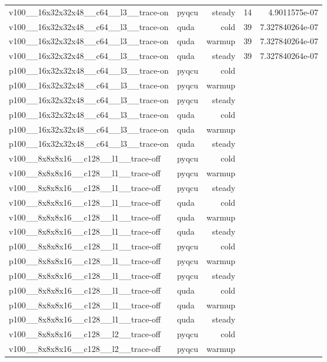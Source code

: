\begin{table}[htbp]
\begin{tabular}{@{}llrrr@{}}
v100\_\_16x32x32x48\_\_c64\_\_l3\_\_trace-on & pyqcu & steady & 14 & 4.9011575e-07 \\
v100\_\_16x32x32x48\_\_c64\_\_l3\_\_trace-on & quda & cold & 39 & 7.327840264e-07 \\
v100\_\_16x32x32x48\_\_c64\_\_l3\_\_trace-on & quda & warmup & 39 & 7.327840264e-07 \\
v100\_\_16x32x32x48\_\_c64\_\_l3\_\_trace-on & quda & steady & 39 & 7.327840264e-07 \\
p100\_\_16x32x32x48\_\_c64\_\_l3\_\_trace-on & pyqcu & cold &  &  \\
p100\_\_16x32x32x48\_\_c64\_\_l3\_\_trace-on & pyqcu & warmup &  &  \\
p100\_\_16x32x32x48\_\_c64\_\_l3\_\_trace-on & pyqcu & steady &  &  \\
p100\_\_16x32x32x48\_\_c64\_\_l3\_\_trace-on & quda & cold &  &  \\
p100\_\_16x32x32x48\_\_c64\_\_l3\_\_trace-on & quda & warmup &  &  \\
p100\_\_16x32x32x48\_\_c64\_\_l3\_\_trace-on & quda & steady &  &  \\
v100\_\_8x8x8x16\_\_c128\_\_l1\_\_trace-off & pyqcu & cold &  &  \\
v100\_\_8x8x8x16\_\_c128\_\_l1\_\_trace-off & pyqcu & warmup &  &  \\
v100\_\_8x8x8x16\_\_c128\_\_l1\_\_trace-off & pyqcu & steady &  &  \\
v100\_\_8x8x8x16\_\_c128\_\_l1\_\_trace-off & quda & cold &  &  \\
v100\_\_8x8x8x16\_\_c128\_\_l1\_\_trace-off & quda & warmup &  &  \\
v100\_\_8x8x8x16\_\_c128\_\_l1\_\_trace-off & quda & steady &  &  \\
p100\_\_8x8x8x16\_\_c128\_\_l1\_\_trace-off & pyqcu & cold &  &  \\
p100\_\_8x8x8x16\_\_c128\_\_l1\_\_trace-off & pyqcu & warmup &  &  \\
p100\_\_8x8x8x16\_\_c128\_\_l1\_\_trace-off & pyqcu & steady &  &  \\
p100\_\_8x8x8x16\_\_c128\_\_l1\_\_trace-off & quda & cold &  &  \\
p100\_\_8x8x8x16\_\_c128\_\_l1\_\_trace-off & quda & warmup &  &  \\
p100\_\_8x8x8x16\_\_c128\_\_l1\_\_trace-off & quda & steady &  &  \\
v100\_\_8x8x8x16\_\_c128\_\_l2\_\_trace-off & pyqcu & cold &  &  \\
v100\_\_8x8x8x16\_\_c128\_\_l2\_\_trace-off & pyqcu & warmup &  &  \\

\end{tabular}
\end{table}
